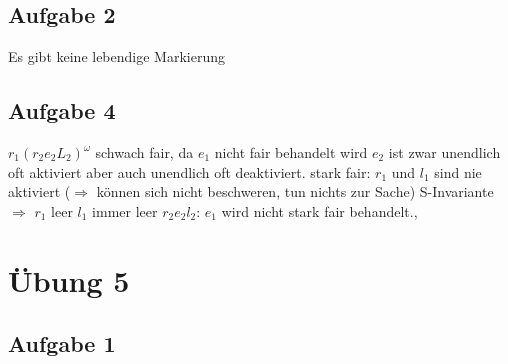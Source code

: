 \documentclass[12pt]{scrreprt}
\begin{document}
\subsection*{Aufgabe 2}
Es gibt keine lebendige Markierung

\subsection*{Aufgabe 4}
$r_1(r_2 e_2 L_2)^\omega$\newline
schwach fair, da $e_1$ nicht fair behandelt wird\newline
$e_2$ ist zwar unendlich oft aktiviert aber auch unendlich oft deaktiviert.\newline
stark fair:\newline
$r_1$ und $l_1$ sind nie aktiviert ($\Rightarrow$ können sich nicht beschweren, tun nichts zur Sache)\newline
S-Invariante $\Rightarrow$ $r_1$ leer $l_1$ immer leer\newline
$r_2 e_2 l_2$: $e_1$ wird nicht stark fair behandelt.,

\newpage

\section{Übung 5}
\subsection*{Aufgabe 1}
\end{document}
